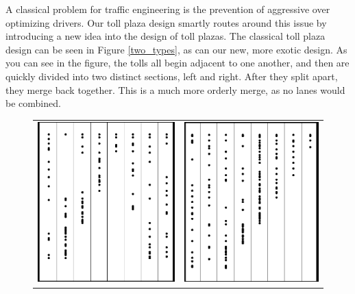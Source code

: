 \documentclass[a4paper, 11pt]{article}
\begin{document}
A classical problem for traffic engineering is the prevention of aggressive over optimizing drivers. Our toll plaza design smartly routes around this issue by introducing a new idea into the design of toll plazas. The classical toll plaza design can be seen in Figure \ref{two_types}, as can our new, more exotic design. As you can see in the figure, the tolls all begin adjacent to one another, and then are quickly divided into two distinct sections, left and right. After they split apart, they merge back together. This is a much more orderly merge, as no lanes would be combined. 

\begin{figure}[H]
\begin{center}
\begin{tabular}{c c}
\includegraphics[scale=0.125]{Images/4By8MidTriOne.png} & \includegraphics[scale=0.125]{Images/3By8LeftOne.png}
\end{tabular}
\end{center}
\cap
\end{figure}
\end{document}
